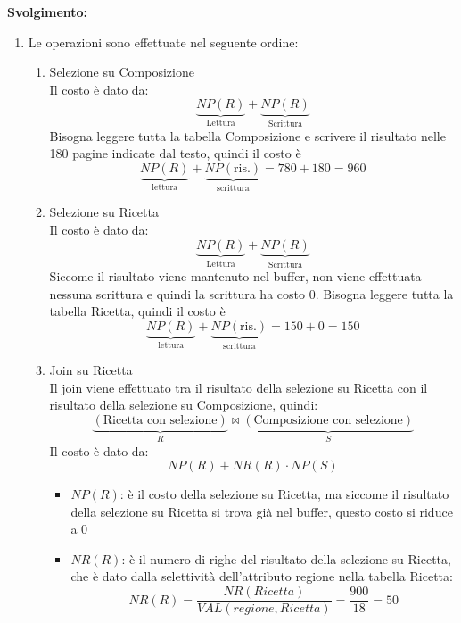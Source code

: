 \documentclass[a4paper,twoside]{article}
\begin{document}
\begin{exercise}
  \vspace{1em}
  \noindent
  \textbf{Svolgimento:}
  \begin{enumerate}
    \item Le operazioni sono effettuate nel seguente ordine:
      \begin{enumerate}
        \item Selezione su Composizione\\
          Il costo è dato da:
          \[
            \underbrace{NP(R)}_{\text{Lettura}} + 
            \underbrace{NP(R)}_{\text{Scrittura}}
          \] 
          Bisogna leggere tutta la tabella Composizione e scrivere il risultato
          nelle 180 pagine indicate dal testo, quindi il costo è
          \[
            \underbrace{NP(R)}_{\text{lettura}} +
            \underbrace{NP(\text{ris.})}_{\text{scrittura}} = 780 + 180 = 960
          \] 

        \item Selezione su Ricetta\\
          Il costo è dato da:
          \[
            \underbrace{NP(R)}_{\text{Lettura}} + 
            \underbrace{NP(R)}_{\text{Scrittura}}
          \] 
          Siccome il risultato viene mantenuto nel buffer, non viene effettuata nessuna
          scrittura e quindi la scrittura ha costo 0.
          Bisogna leggere tutta la tabella Ricetta, quindi il costo è
          \[
            \underbrace{NP(R)}_{\text{lettura}} +
            \underbrace{NP(\text{ris.})}_{\text{scrittura}} = 150 + 0 = 150
          \]

        \item Join su Ricetta\\
          Il join viene effettuato tra il risultato della selezione su Ricetta
          con il risultato della selezione su Composizione, quindi:
          \[
            \underbrace{(\text{Ricetta con selezione})}_{R} \bowtie
            \underbrace{(\text{Composizione con selezione})}_{S}
          \] 
          Il costo è dato da:
          \[
            NP(R) + NR(R) \cdot NP(S)
          \] 
          \begin{itemize}
            \item \( NP(R) \): è il costo della selezione su Ricetta, ma siccome il risultato
              della selezione su Ricetta si trova già nel buffer, questo costo si riduce a 0

            \item \( NR(R) \): è il numero di righe del risultato della selezione su Ricetta, che è dato
              dalla selettività dell'attributo regione nella tabella Ricetta:
              \[
                NR(R) = \frac{NR(Ricetta)}{VAL(regione, Ricetta)} = \frac{900}{18} = 50
              \]


\end{itemize}
\end{enumerate}
\end{enumerate}
\end{exercise}
\end{document}

